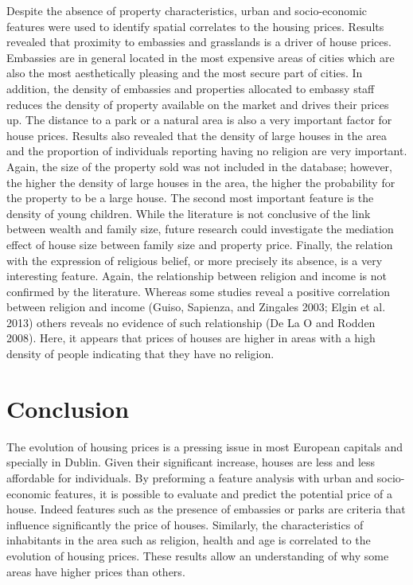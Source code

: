\documentclass[conference,final,]{IEEEtran}
\begin{document}
Despite the absence of property characteristics, urban and socio-economic features were used to identify spatial correlates to the housing prices. Results revealed that proximity to embassies and grasslands is a driver of house prices. Embassies are in general located in the most expensive areas of cities which are also the most aesthetically pleasing and the most secure part of cities. In addition, the density of embassies and properties allocated to embassy staff reduces the density of property available on the market and drives their prices up. The distance to a park or a natural area is also a very important factor for house prices. Results also revealed that the density of large houses in the area and the proportion of individuals reporting having no religion are very important. Again, the size of the property sold was not included in the database; however, the higher the density of large houses in the area, the higher the probability for the property to be a large house. The second most important feature is the density of young children. While the literature is not conclusive of the link between wealth and family size, future research could investigate the mediation effect of house size between family size and property price. Finally, the relation with the expression of religious belief, or more precisely its absence, is a very interesting feature. Again, the relationship between religion and income is not confirmed by the literature. Whereas some studies reveal a positive correlation between religion and income (Guiso, Sapienza, and Zingales 2003; Elgin et al. 2013) others reveals no evidence of such relationship (De La O and Rodden 2008). Here, it appears that prices of houses are higher in areas with a high density of people indicating that they have no religion.

\hypertarget{conclusion}{%
\section{Conclusion}\label{conclusion}}

The evolution of housing prices is a pressing issue in most European capitals and specially in Dublin. Given their significant increase, houses are less and less affordable for individuals. By preforming a feature analysis with urban and socio-economic features, it is possible to evaluate and predict the potential price of a house. Indeed features such as the presence of embassies or parks are criteria that influence significantly the price of houses. Similarly, the characteristics of inhabitants in the area such as religion, health and age is correlated to the evolution of housing prices. These results allow an understanding of why some areas have higher prices than others.
\end{document}
